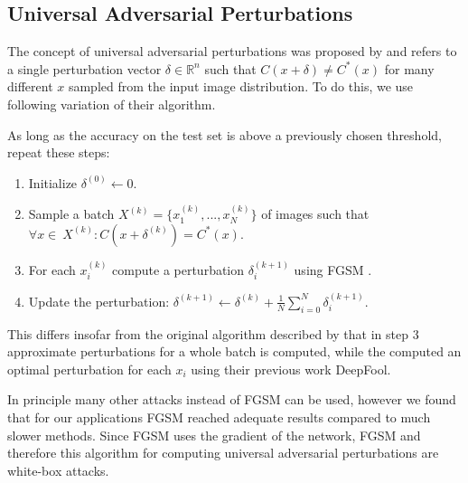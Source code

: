 \subsection{Universal Adversarial Perturbations}

The concept of universal adversarial perturbations was proposed by \citet{universal} and refers to a single perturbation vector $\delta \in \mathbb{R}^n$ such that $C(x + \delta) \neq C^*(x)$ for many different $x$ sampled from the input image distribution.
To do this, we use following variation of their algorithm.

As long as the accuracy on the test set is above a previously chosen threshold, repeat these steps:
\begin{enumerate}
	\item Initialize $\delta^{(0)} \gets 0$.
	\item Sample a batch $X^{(k)} = \{x_1^{(k)}, ..., x_N^{(k)}\}$ of images such that $\forall x \in\ X^{(k)}:C(x + \delta^{(k)}) = C^*(x)$.
	\item For each $x_i^{(k)}$ compute a perturbation $\delta_i^{(k+1)}$ using FGSM \citep{fgsm}.
	\item Update the perturbation: $\delta^{(k+1)} \gets \delta^{(k)} + \frac{1}{N} \sum\limits_{i=0}^N \delta_i^{(k+1)}$.
\end{enumerate}

This differs insofar from the original algorithm described by \citet{universal} that in step 3 approximate perturbations for a whole batch is computed, while the computed an optimal perturbation for each $x_i$ using their previous work DeepFool.

In principle many other attacks instead of FGSM can be used, however we found that for our applications FGSM reached adequate results compared to much slower methods.
Since FGSM uses the gradient of the network, FGSM and therefore this algorithm for computing universal adversarial perturbations are white-box attacks.
